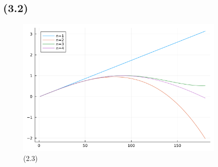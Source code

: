 \documentclass[uplatex, dvipdfmx, a4j,11pt]{jsarticle}
\begin{document}
\subsection*{(3.2)}
\begin{figure}[h]
  \begin{center}
    \includegraphics[width=100mm]{sin_maclaurin.png}
    \caption{(2.3)}
  \end{center}
\end{figure}
\end{document}
